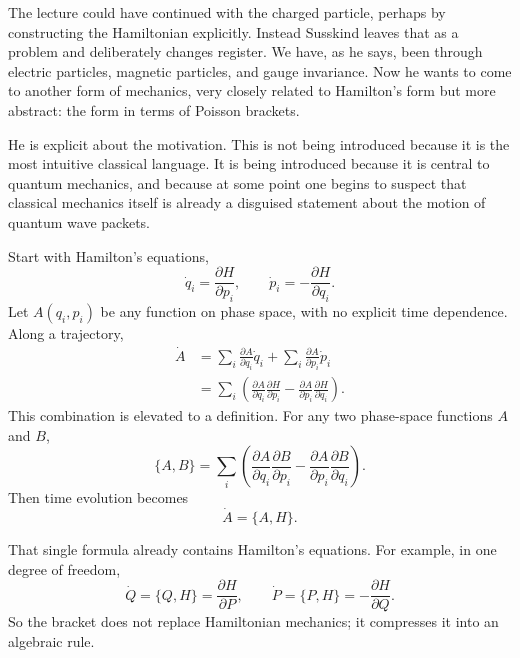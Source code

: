 The lecture could have continued with the charged particle, perhaps by constructing the Hamiltonian explicitly. Instead Susskind leaves that as a problem and deliberately changes register. We have, as he says, been through electric particles, magnetic particles, and gauge invariance. Now he wants to come to another form of mechanics, very closely related to Hamilton's form but more abstract: the form in terms of Poisson brackets.

He is explicit about the motivation. This is not being introduced because it is the most intuitive classical language. It is being introduced because it is central to quantum mechanics, and because at some point one begins to suspect that classical mechanics itself is already a disguised statement about the motion of quantum wave packets.

Start with Hamilton's equations,
\begin{equation}
\dot q_i=\frac{\partial H}{\partial p_i},
\qquad
\dot p_i=-\frac{\partial H}{\partial q_i}.
\end{equation}
Let \(A(q_i,p_i)\) be any function on phase space, with no explicit time dependence. Along a trajectory,
\begin{align}
\dot A
&=
\sum_i\frac{\partial A}{\partial q_i}\dot q_i
+\sum_i\frac{\partial A}{\partial p_i}\dot p_i \\
&=
\sum_i
\left(
\frac{\partial A}{\partial q_i}\frac{\partial H}{\partial p_i}
-\frac{\partial A}{\partial p_i}\frac{\partial H}{\partial q_i}
\right).
\end{align}
This combination is elevated to a definition. For any two phase-space functions \(A\) and \(B\),
\begin{equation}
\{A,B\}
=
\sum_i
\left(
\frac{\partial A}{\partial q_i}\frac{\partial B}{\partial p_i}
-
\frac{\partial A}{\partial p_i}\frac{\partial B}{\partial q_i}
\right).
\end{equation}
Then time evolution becomes
\begin{equation}
\dot A=\{A,H\}.
\end{equation}

That single formula already contains Hamilton's equations. For example, in one degree of freedom,
\begin{equation}
\dot Q=\{Q,H\}=\frac{\partial H}{\partial P},
\qquad
\dot P=\{P,H\}=-\frac{\partial H}{\partial Q}.
\end{equation}
So the bracket does not replace Hamiltonian mechanics; it compresses it into an algebraic rule.

